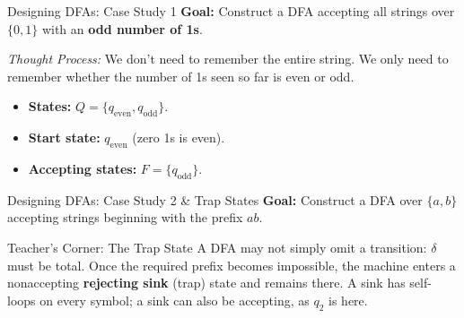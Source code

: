 \documentclass[10pt]{beamer}
\begin{document}
\begin{frame}{Designing DFAs: Case Study 1}
  \small
  \textbf{Goal:} Construct a DFA accepting all strings over $\{0,1\}$ with an \textbf{odd number of 1s}.
  \pause
  \vspace{0.2cm}
  
  \textit{Thought Process:} We don't need to remember the entire string. We only need to remember whether the number of 1s seen so far is even or odd.
  \pause
  
  \begin{center}
  \end{center}
  
  \begin{itemize}
      \item \textbf{States:} $Q = \{q_{\mathrm{even}},q_{\mathrm{odd}}\}$.
      \item \textbf{Start state:} $q_{\mathrm{even}}$ (zero 1s is even).
      \item \textbf{Accepting states:} $F=\{q_{\mathrm{odd}}\}$.
  \end{itemize}
\end{frame}

\begin{frame}{Designing DFAs: Case Study 2 \& Trap States}
  \footnotesize
  \textbf{Goal:} Construct a DFA over $\{a,b\}$ accepting strings beginning
  with the prefix $ab$.
  \pause
  \begin{center}
  \end{center}
  \pause
  \begin{alertblock}{Teacher's Corner: The Trap State}
    A DFA may not simply omit a transition: $\delta$ must be total. Once the
    required prefix becomes impossible, the machine enters a nonaccepting
    \textbf{rejecting sink} (trap) state and remains there. A sink has
    self-loops on every symbol; a sink can also be accepting, as $q_2$ is here.
  \end{alertblock}
\end{frame}
\end{document}
